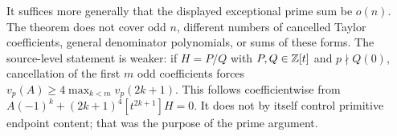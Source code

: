 It suffices more generally that the displayed exceptional prime sum
be $o(n)$. The theorem does not cover odd $n$, different numbers of
cancelled Taylor coefficients, general denominator polynomials, or sums
of these forms. The source-level statement is weaker: if $H=P/Q$ with
$P,Q\in\mathbb Z[t]$ and $p\nmid Q(0)$, cancellation of the first $m$ odd
coefficients forces
$v_p(A)\geq4\max_{k<m}v_p(2k+1)$. This follows coefficientwise from
$A(-1)^k+(2k+1)^4[t^{2k+1}]H=0$. It does not by itself control
primitive endpoint content; that was the purpose of the prime argument.
